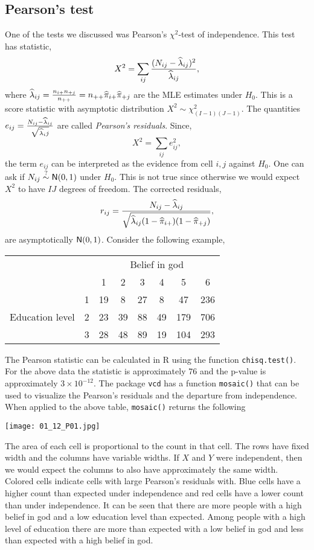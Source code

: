 \subsection{Pearson's test}
One of the tests we discussed was Pearson's $\chi^2$-test of independence. This test has statistic,
\[X^2 = \sum_{ij} \frac{(N_{ij}-\widehat{\lambda}_{ij})^2}{\widehat{\lambda}_{ij}}, \]
where $\widehat{\lambda}_{ij} = \frac{n_{i+}n_{+j}}{n_{++}} = n_{++}\widehat{\pi}_{i+}\widehat{\pi}_{+j}$ are the MLE estimates under $H_0$. This is a score statistic with asymptotic distribution $X^2 \sim \chi^2_{(I-1)(J-1)}$.  The quantities $e_{ij} = \frac{N_{ij}-\widehat{\lambda}_{ij}}{\sqrt{\widehat{\lambda}_ij}}$ are called \emph{Pearson's residuals}. Since,
\[X^2 = \sum_{ij} e_{ij}^2,\]
the term $e_{ij}$ can be interpreted as the evidence from cell $i,j$ against $H_0$. One can ask if $N_{ij} \stackrel{?}{\sim} \mathsf{N}(0,1)$ under $H_0$. This is not true since otherwise we would expect $X^2$ to have $IJ$ degrees of freedom. The corrected residuals,
\[r_{ij} = \frac{N_{ij}-\widehat{\lambda}_{ij}}{\sqrt{\widehat{\lambda}_{ij}(1-\widehat{\pi}_{i+})(1-\widehat{\pi}_{+j})}}, \]
are asymptotically $\mathsf{N}(0,1)$. Consider the following example,
\begin{center}
    \begin{tabular}{cc|cccccc}
        &&\multicolumn{6}{c}{Belief in god}\\
        &&1&2&3&4&5&6\\
        \hline 
        \multirow{3}{*}{Education level}&1&19& 8& 27& 8& 47& 236\\
        &2&23& 39& 88& 49& 179& 706\\
        &3&28& 48& 89& 19& 104& 293
    \end{tabular}
\end{center}
The Pearson statistic can be calculated in R using the function \texttt{chisq.test()}. For the above data the statistic is approximately 76 and the p-value is approximately $3\times 10^{-12}$. The package \texttt{vcd} has a function \texttt{mosaic()} that can be used to visualize the Pearson's residuals and the departure from independence. When applied to the above table, \texttt{mosaic()} returns the following
\begin{center}
    \texttt{[image: 01\_12\_P01.jpg]}
\end{center}
The area of each cell is proportional to the count in that cell. The rows have fixed width and the columns have variable widths. If $X$ and $Y$ were independent, then we would expect the columns to also have approximately the same width. Colored cells indicate cells with large Pearson's residuals with. Blue cells have a higher count than expected under independence and red cells have a lower count than under independence. It can be seen that there are more people with a high belief in god and a low education level than expected. Among people with a high level of education there are more than expected with a low belief in god and less than expected with a high belief in god.
